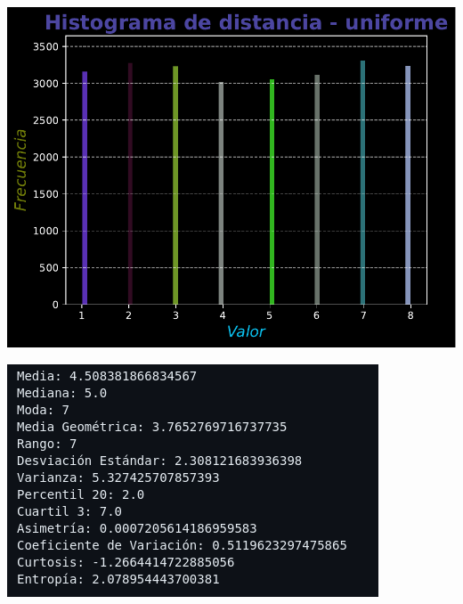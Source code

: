 \documentclass[11pt]{article} %
\begin{document}
	 \begin{multicols}{2}
	 	\begin{minipage}{\linewidth}
	 		\centering
	 		\includegraphics[width=1\linewidth]{hist_distancia_uniforme.pdf}
	 		\label{fig:distUnifHist}
	 	\end{minipage}
	 	\vfill\columnbreak
	 	\begin{minipage}{\linewidth}
	 		\centering
	 		\includegraphics[width=1\linewidth]{u2.png}%
	 		\label{distUnifMet}
	 	\end{minipage}
	 \end{multicols}
	 
\end{document}
